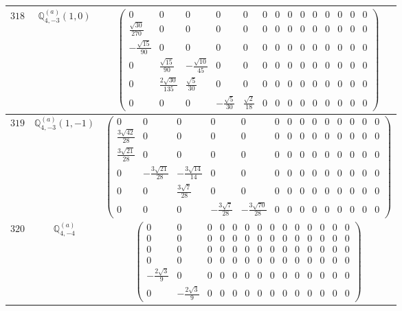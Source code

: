 \documentclass[fleqn,8pt,landscape]{jsarticle}
\begin{document}
\begin{center}
\begin{longtable}{ccc}
$ 318 $ & $ \mathbb{Q}_{4,-3}^{(a)}(1,0) $ & $ \begin{pmatrix} 0 & 0 & 0 & 0 & 0 & 0 & 0 & 0 & 0 & 0 & 0 & 0 & 0 & 0 \\ \frac{\sqrt{30}}{270} & 0 & 0 & 0 & 0 & 0 & 0 & 0 & 0 & 0 & 0 & 0 & 0 & 0 \\ - \frac{\sqrt{15}}{90} & 0 & 0 & 0 & 0 & 0 & 0 & 0 & 0 & 0 & 0 & 0 & 0 & 0 \\ 0 & \frac{\sqrt{15}}{90} & - \frac{\sqrt{10}}{45} & 0 & 0 & 0 & 0 & 0 & 0 & 0 & 0 & 0 & 0 & 0 \\ 0 & \frac{2 \sqrt{30}}{135} & \frac{\sqrt{5}}{30} & 0 & 0 & 0 & 0 & 0 & 0 & 0 & 0 & 0 & 0 & 0 \\ 0 & 0 & 0 & - \frac{\sqrt{5}}{30} & \frac{\sqrt{2}}{18} & 0 & 0 & 0 & 0 & 0 & 0 & 0 & 0 & 0 \end{pmatrix} $ \\ \hline
$ 319 $ & $ \mathbb{Q}_{4,-3}^{(a)}(1,-1) $ & $ \begin{pmatrix} 0 & 0 & 0 & 0 & 0 & 0 & 0 & 0 & 0 & 0 & 0 & 0 & 0 & 0 \\ \frac{3 \sqrt{42}}{28} & 0 & 0 & 0 & 0 & 0 & 0 & 0 & 0 & 0 & 0 & 0 & 0 & 0 \\ \frac{3 \sqrt{21}}{28} & 0 & 0 & 0 & 0 & 0 & 0 & 0 & 0 & 0 & 0 & 0 & 0 & 0 \\ 0 & - \frac{3 \sqrt{21}}{28} & - \frac{3 \sqrt{14}}{14} & 0 & 0 & 0 & 0 & 0 & 0 & 0 & 0 & 0 & 0 & 0 \\ 0 & 0 & \frac{3 \sqrt{7}}{28} & 0 & 0 & 0 & 0 & 0 & 0 & 0 & 0 & 0 & 0 & 0 \\ 0 & 0 & 0 & - \frac{3 \sqrt{7}}{28} & - \frac{3 \sqrt{70}}{28} & 0 & 0 & 0 & 0 & 0 & 0 & 0 & 0 & 0 \end{pmatrix} $ \\ \hline
$ 320 $ & $ \mathbb{Q}_{4,-4}^{(a)} $ & $ \begin{pmatrix} 0 & 0 & 0 & 0 & 0 & 0 & 0 & 0 & 0 & 0 & 0 & 0 & 0 & 0 \\ 0 & 0 & 0 & 0 & 0 & 0 & 0 & 0 & 0 & 0 & 0 & 0 & 0 & 0 \\ 0 & 0 & 0 & 0 & 0 & 0 & 0 & 0 & 0 & 0 & 0 & 0 & 0 & 0 \\ 0 & 0 & 0 & 0 & 0 & 0 & 0 & 0 & 0 & 0 & 0 & 0 & 0 & 0 \\ - \frac{2 \sqrt{3}}{9} & 0 & 0 & 0 & 0 & 0 & 0 & 0 & 0 & 0 & 0 & 0 & 0 & 0 \\ 0 & - \frac{2 \sqrt{3}}{9} & 0 & 0 & 0 & 0 & 0 & 0 & 0 & 0 & 0 & 0 & 0 & 0 \end{pmatrix} $ \\ \hline

\end{longtable}
\end{center}
\end{document}
